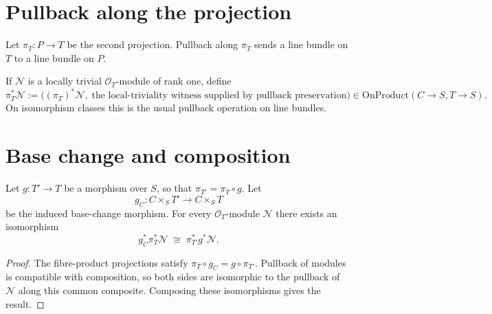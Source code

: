 \section{Pullback along the projection}
\label{mk-sec:lbp_pullback_projection}

Let $\pi_T:P\to T$ be the second projection.  Pullback along $\pi_T$ sends a
line bundle on $T$ to a line bundle on $P$.

\begin{definition}\label{mk-def:pullback_along_projection}
  \leanok

  If $\mathcal N$ is a locally trivial $\mathcal O_T$-module of rank one, define
  \[
    \pi_T^*\mathcal N
      :=\bigl((\pi_T)^*\mathcal N,\;\text{the local-triviality witness
         supplied by pullback preservation}\bigr)
      \in \mathrm{OnProduct}(C\to S,T\to S).
  \]
  On isomorphism classes this is the usual pullback operation on line bundles.
\end{definition}

\section{Base change and composition}
\label{mk-sec:lbp_compose}

\begin{lemma}\label{mk-lem:pullback_compose}
  \leanok

  Let $g:T'\to T$ be a morphism over $S$, so that
  $\pi_{T'}=\pi_T\circ g$.  Let
  \[
    g_C:C\times_S T'\longrightarrow C\times_S T
  \]
  be the induced base-change morphism.  For every $\mathcal O_T$-module
  $\mathcal N$ there exists an isomorphism
  \[
    g_C^*\pi_T^*\mathcal N
      \;\cong\;\pi_{T'}^*g^*\mathcal N.
  \]
\end{lemma}
\begin{proof}
  \leanok
  The fibre-product projections satisfy
  $\pi_T\circ g_C=g\circ\pi_{T'}$.  Pullback of modules is compatible with
  composition, so both sides are isomorphic to the pullback of $\mathcal N$
  along this common composite.  Composing these isomorphisms gives the result.
\end{proof}

